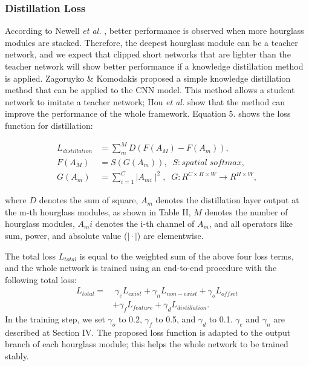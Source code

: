 \documentclass[journal]{IEEEtran}
\begin{document}
\subsubsection{Distillation Loss}
According to Newell \textit{et al.} \cite{newell2016stacked}, better performance is observed when more hourglass modules are stacked. Therefore, the deepest hourglass module can be a teacher network, and we expect that clipped short networks that are lighter than the teacher network will show better performance if a knowledge distillation method is applied. Zagoruyko \& Komodakis \cite{zagoruyko2016paying} proposed a simple knowledge distillation method that can be applied to the CNN model. This method allows a student network to imitate a teacher network; Hou \textit{et al.} \cite{hou2019learning} show that the method can improve the performance of the whole framework. Equation 5. shows the loss function for distillation:

\begin{equation}
    \begin{aligned}
        L_{distillation} & = \sum_{m}^{M}{D(F(A_M) - F(A_m))} ,
        \\
        F(A_M) & = S(G(A_m)), \;\; S : spatial \; softmax ,
        \\
        G(A_m) & = \sum_{i=1}^{C}{\mid A_{mi} \mid^2}, \;\; G : R^{C \times H \times W} \rightarrow R^{ H \times W} ,
    \end{aligned}
\end{equation}

where $D$ denotes the sum of square, $A_m$ denotes the distillation layer output at the m-th hourglass modules, as shown in Table II, $M$ denotes the number of hourglass modules, $A_mi$ denotes the i-th channel of $A_m$, and all operators like sum, power, and absolute value ($\mid \cdot \mid$) are elementwise.

The total loss $L_{total}$ is equal to the weighted sum of the above four loss terms, and the whole network is trained using an end-to-end procedure with the following total loss:
\begin{equation}
    \begin{aligned}
        L_{total}= & \; \gamma_e L_{exist} + \gamma_n L_{non-exist} + \gamma_o L_{offset}
        \\
        & + \gamma_f L_{feature} + \gamma_d L_{distillation} .
    \end{aligned}
\end{equation}
In the training step, we set $\gamma_o$ to 0.2, $\gamma_f$ to 0.5, and $\gamma_d$ to 0.1. $\gamma_e$ and $\gamma_n$ are described at Section IV. The proposed loss function is adapted to the output branch of each hourglass module; this helps the whole network to be trained stably.
\end{document}
